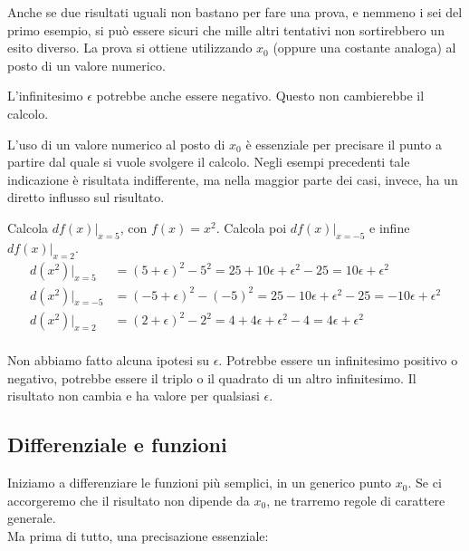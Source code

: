 Anche se due risultati uguali non bastano per fare una prova, e nemmeno i sei 
del primo esempio, si può essere sicuri che mille altri tentativi non
sortirebbero un esito diverso. La prova si ottiene utilizzando $x_0$ 
(oppure una costante analoga) al posto di un valore numerico.

\begin{osservazione}
 L'infinitesimo $\epsilon$ potrebbe anche essere negativo. Questo non 
cambierebbe il calcolo.\\
\end{osservazione}

L'uso di un valore numerico al posto di $x_0$ è essenziale per precisare il
punto a partire dal quale si vuole svolgere il calcolo. Negli esempi 
precedenti tale indicazione è risultata indifferente, ma nella maggior parte 
dei casi, invece, ha un diretto influsso sul risultato.\\

\begin{esempio}
 Calcola $df(x)|_{x=5}$, con $f(x)=x^2$. Calcola poi $df(x)|_{x=-5}$ 
 e infine $df(x)|_{x=2}$.
 \begin{align*} 
  d(x^2)|_{x=5} & 
=(5+\epsilon)^2-5^2=25+10\epsilon+\epsilon^2-25=10\epsilon+\epsilon^2\\
  d(x^2)|_{x=-5}& 
=(-5+\epsilon)^2-(-5)^2=25-10\epsilon+\epsilon^2-25=-10\epsilon+\epsilon^2\\
  d(x^2)|_{x=2} & 
=(2+\epsilon)^2-2^2=4+4\epsilon+\epsilon^2-4=4\epsilon+\epsilon^2\\
 \end{align*}
\end{esempio}


\begin{osservazione}
 Non abbiamo fatto alcuna ipotesi su $\epsilon$. 
 Potrebbe essere un infinitesimo positivo o negativo, 
 potrebbe essere il triplo o il quadrato di un altro infinitesimo. 
 Il risultato non cambia e ha valore per qualsiasi $\epsilon$.
\end{osservazione}



\subsection{Differenziale e funzioni}
\label{subsec:diff01_difffun}
Iniziamo a differenziare le funzioni più semplici, in un generico punto $x_0$.
Se ci accorgeremo che il risultato non dipende da $x_0$, ne trarremo regole
di carattere generale.\\
Ma prima di tutto, una precisazione essenziale:

